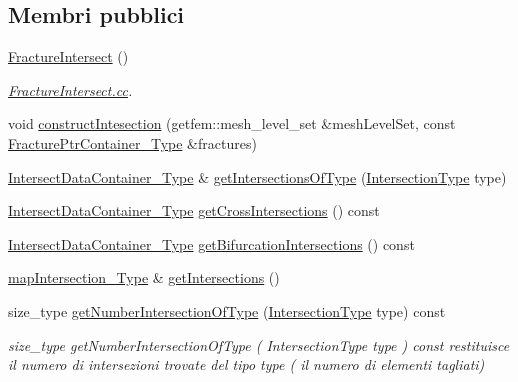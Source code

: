 \subsection*{Membri pubblici}
\begin{DoxyCompactItemize}
\item 
\hyperlink{classFractureIntersect_a2416c29105bde5cbf9032b04db47ba31}{Fracture\-Intersect} ()
\begin{DoxyCompactList}\small\item\em \hyperlink{FractureIntersect_8cc}{Fracture\-Intersect.\-cc}. \end{DoxyCompactList}\item 
void \hyperlink{classFractureIntersect_ae0950cef2ad74a06158f59e5d270084b}{construct\-Intesection} (getfem\-::mesh\-\_\-level\-\_\-set \&mesh\-Level\-Set, const \hyperlink{FractureHandler_8h_a2f0b57e18ecf89912d7de0c87158009e}{Fracture\-Ptr\-Container\-\_\-\-Type} \&fractures)
\item 
\hyperlink{IntersectData_8h_a822ec3b760dfb603e1cf0bfe3ad5636a}{Intersect\-Data\-Container\-\_\-\-Type} \& \hyperlink{classFractureIntersect_a891c902329fde6f8de70bb1bf371ccbc}{get\-Intersections\-Of\-Type} (\hyperlink{classFractureIntersect_a9a4e4a784fa4c8e359767ed543f89dc5}{Intersection\-Type} type)
\item 
\hyperlink{IntersectData_8h_a822ec3b760dfb603e1cf0bfe3ad5636a}{Intersect\-Data\-Container\-\_\-\-Type} \hyperlink{classFractureIntersect_a248df8f326f844e34d807234efdfd693}{get\-Cross\-Intersections} () const 
\item 
\hyperlink{IntersectData_8h_a822ec3b760dfb603e1cf0bfe3ad5636a}{Intersect\-Data\-Container\-\_\-\-Type} \hyperlink{classFractureIntersect_a18ff664767b7e8ffa876b80a6100e74d}{get\-Bifurcation\-Intersections} () const 
\item 
\hyperlink{classFractureIntersect_a4eea7d0aca48cdd36ea1756e75280332}{map\-Intersection\-\_\-\-Type} \& \hyperlink{classFractureIntersect_a1b785b0ed94d3a403b9f0e21f092b4ab}{get\-Intersections} ()
\item 
size\-\_\-type \hyperlink{classFractureIntersect_a1cd070dda9460d884c1b1d92edfecc12}{get\-Number\-Intersection\-Of\-Type} (\hyperlink{classFractureIntersect_a9a4e4a784fa4c8e359767ed543f89dc5}{Intersection\-Type} type) const 
\begin{DoxyCompactList}\small\item\em size\-\_\-type get\-Number\-Intersection\-Of\-Type ( Intersection\-Type type ) const restituisce il numero di intersezioni trovate del tipo type ( il numero di elementi tagliati) \end{DoxyCompactList}\item 

\end{DoxyCompactItemize}
